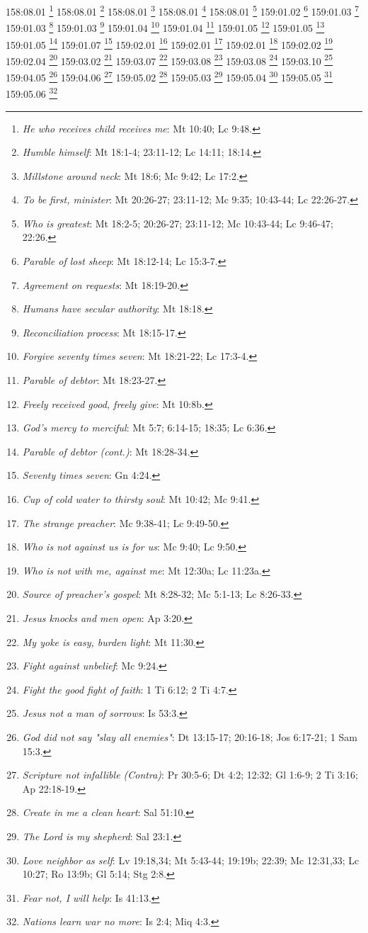 {{{{{{{{{{{{{{{{{{{{{{{{{{{{{{{{{{{{158:08.01 \footnote{\textit{He who receives child receives me}: Mt 10:40; Lc 9:48.}
158:08.01 \footnote{\textit{Humble himself}: Mt 18:1-4; 23:11-12; Lc 14:11; 18:14.}
158:08.01 \footnote{\textit{Millstone around neck}: Mt 18:6; Mc 9:42; Lc 17:2.}
158:08.01 \footnote{\textit{To be first, minister}: Mt 20:26-27; 23:11-12; Mc 9:35; 10:43-44; Lc 22:26-27.}
158:08.01 \footnote{\textit{Who is greatest}: Mt 18:2-5; 20:26-27; 23:11-12; Mc 10:43-44; Lc 9:46-47; 22:26.}
159:01.02 \footnote{\textit{Parable of lost sheep}: Mt 18:12-14; Lc 15:3-7.}
159:01.03 \footnote{\textit{Agreement on requests}: Mt 18:19-20.}
159:01.03 \footnote{\textit{Humans have secular authority}: Mt 18:18.}
159:01.03 \footnote{\textit{Reconciliation process}: Mt 18:15-17.}
159:01.04 \footnote{\textit{Forgive seventy times seven}: Mt 18:21-22; Lc 17:3-4.}
159:01.04 \footnote{\textit{Parable of debtor}: Mt 18:23-27.}
159:01.05 \footnote{\textit{Freely received good, freely give}: Mt 10:8b.}
159:01.05 \footnote{\textit{God's mercy to merciful}: Mt 5:7; 6:14-15; 18:35; Lc 6:36.}
159:01.05 \footnote{\textit{Parable of debtor (cont.)}: Mt 18:28-34.}
159:01.07 \footnote{\textit{Seventy times seven}: Gn 4:24.}
159:02.01 \footnote{\textit{Cup of cold water to thirsty soul}: Mt 10:42; Mc 9:41.}
159:02.01 \footnote{\textit{The strange preacher}: Mc 9:38-41; Lc 9:49-50.}
159:02.01 \footnote{\textit{Who is not against us is for us}: Mc 9:40; Lc 9:50.}
159:02.02 \footnote{\textit{Who is not with me, against me}: Mt 12:30a; Lc 11:23a.}
159:02.04 \footnote{\textit{Source of preacher's gospel}: Mt 8:28-32; Mc 5:1-13; Lc 8:26-33.}
159:03.02 \footnote{\textit{Jesus knocks and men open}: Ap 3:20.}
159:03.07 \footnote{\textit{My yoke is easy, burden light}: Mt 11:30.}
159:03.08 \footnote{\textit{Fight against unbelief}: Mc 9:24.}
159:03.08 \footnote{\textit{Fight the good fight of faith}: 1 Ti 6:12; 2 Ti 4:7.}
159:03.10 \footnote{\textit{Jesus not a man of sorrows}: Is 53:3.}
159:04.05 \footnote{\textit{God did not say "slay all enemies"}: Dt 13:15-17; 20:16-18; Jos 6:17-21; 1 Sam 15:3.}
159:04.06 \footnote{\textit{Scripture not infallible (Contra)}: Pr 30:5-6; Dt 4:2; 12:32; Gl 1:6-9; 2 Ti 3:16; Ap 22:18-19.}
159:05.02 \footnote{\textit{Create in me a clean heart}: Sal 51:10.}
159:05.03 \footnote{\textit{The Lord is my shepherd}: Sal 23:1.}
159:05.04 \footnote{\textit{Love neighbor as self}: Lv 19:18,34; Mt 5:43-44; 19:19b; 22:39; Mc 12:31,33; Lc 10:27; Ro 13:9b; Gl 5:14; Stg 2:8.}
159:05.05 \footnote{\textit{Fear not, I will help}: Is 41:13.}
159:05.06 \footnote{\textit{Nations learn war no more}: Is 2:4; Miq 4:3.}
}}}}}}}}}}}}}}}}}}}}}}}}}}}}}}}}}}}}
